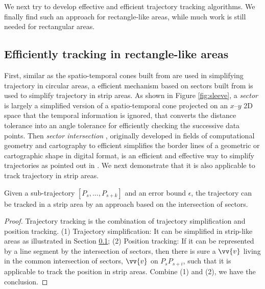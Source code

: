 We next try to develop effective and efficient trajectory tracking algorithms. We finally find such an approach for rectangle-like areas, while much work is still needed for rectangular areas.

\subsection{Efficiently tracking in rectangle-like areas}
\label{sec:track_cone_sector}



First, similar as the spatio-temporal cones built from \sed are used in simplifying trajectory in circular areas, a efficient mechanism based on sectors built from \ped is used to simplify trajectory in strip areas. As shown in Figure \ref{fig:sleeve}, a \emph{sector} is largely a simplified version of a spatio-temporal cone projected on an $x$--$y$ 2D space that the temporal information is ignored, that converts the \ped distance tolerance into an angle tolerance for efficiently checking the successive data points. 
Then \textit{sector intersection} \cite{Williams:Longest, Sklansky:Cone, Dunham:Cone, Zhao:Sleeve}, originally developed in fields of computational geometry and cartography to efficient simplifies the border lines of a geometric or cartographic shape in digital format, is an efficient and effective way to simplify trajectories as pointed out in \cite{Lin:Cised}.
We next demonstrate that it is also applicable to track trajectory in strip areas.


\begin{proposition}
	\label{theo-half-sector}
	Given a sub-trajectory $[P_s,...,P_{s+k}]$ and an error bound $\epsilon$, the trajectory can be tracked in a strip area by an approach based on the intersection of sectors.
\end{proposition}

\begin{proof}
Trajectory tracking is the combination of trajectory simplification and position tracking.
%
(1) Trajectory simplification: It can be simplified in strip-like areas as illustrated in Section \ref{sec:track_cone_sector};
%
(2) Position tracking: If it can be represented by a line segment by the intersection of sectors, then there is sure a $\vv{v}$ living in the common intersection of sectors, \eg $\vv{v}$ on $P_sP_{s+i}$, such that it is applicable to track the position in strip areas.
%
Combine (1) and (2), we have the conclusion.
\end{proof}

